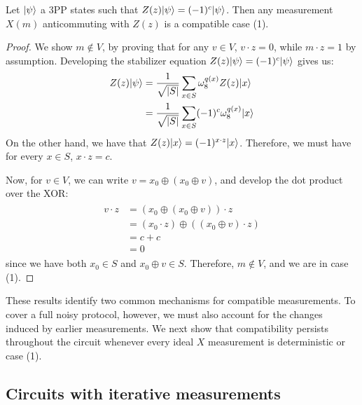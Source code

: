 \begin{theorem}
    \label{thm:anticommuting-z-constraint}
    Let $|\psi\rangle$ a 3PP states such that $Z(z)|\psi\rangle=(-1)^c |\psi\rangle$. Then any measurement $X(m)$ anticommuting with $Z(z)$ is a compatible case (1).
\end{theorem}
\begin{proof}
    We show $m \notin V$, by proving that for any $v \in V$, $v \cdot z = 0$, while $m \cdot z = 1$ by assumption. Developing the stabilizer equation $Z(z) |\psi\rangle = (-1)^c |\psi\rangle$ gives us:
    \begin{align}
        \begin{split}
            Z(z) |\psi\rangle &= \frac{1}{\sqrt{|S|}} \sum_{x \in S} \omega_8^{q(x)} Z(z) |x\rangle \\
            &= \frac{1}{\sqrt{|S|}} \sum_{x \in S} (-1)^c \omega_8^{q(x)} |x\rangle
        \end{split}
    \end{align}
    On the other hand, we have that $Z(z) |x\rangle = (-1)^{x \cdot z} |x\rangle$. Therefore, we must have for every $x \in S$, $x \cdot z = c$.

    Now, for $v \in V$, we can write $v = x_0 \oplus (x_0 \oplus v)$, and develop the dot product over the XOR:
    \begin{align}
        \begin{split}
            v \cdot z
            &= (x_0 \oplus (x_0 \oplus v)) \cdot z \\
            &= (x_0 \cdot z) \oplus \left((x_0 \oplus v) \cdot z\right) \\
            &= c+c \\
            &= 0
        \end{split}
    \end{align}
    since we have both $x_0 \in S$ and $x_0 \oplus v \in S$. Therefore, $m \notin V$, and we are in case (1).
\end{proof}

These results identify two common mechanisms for compatible measurements. To cover a full noisy protocol, however, we must also account for the changes induced by earlier measurements. We next show that compatibility persists throughout the circuit whenever every ideal $X$ measurement is deterministic or case (1).

\subsection{Circuits with iterative measurements}

